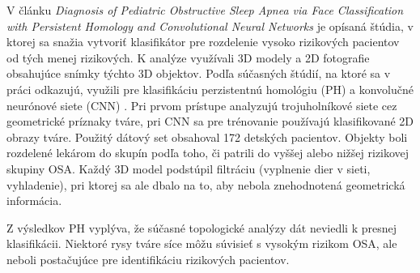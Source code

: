V článku \textit{Diagnosis of Pediatric Obstructive Sleep Apnea via Face Classification with Persistent Homology and Convolutional Neural Networks} \cite{Kiaee2019DiagnosisOP} je opísaná štúdia, v ktorej sa snažia vytvoriť klasifikátor pre rozdelenie vysoko rizikových pacientov od tých menej rizikových. K analýze využívali 3D modely a 2D fotografie obsahujúce snímky týchto 3D objektov. Podľa súčasných štúdií, na ktoré sa v práci odkazujú, využili pre klasifikáciu perzistentnú homológiu (PH) \cite{edelsbrunner2008persistent} a konvolučné neurónové siete (CNN) \cite{szegedy2017inception,szegedy2016rethinking}. Pri prvom prístupe analyzujú trojuholníkové siete cez geometrické príznaky tváre, pri CNN sa pre trénovanie používajú klasifikované 2D obrazy tváre. Použitý dátový set obsahoval 172 detských pacientov. Objekty boli rozdelené lekárom do skupín podľa toho, či patrili do vyššej alebo nižšej rizikovej skupiny OSA. Každý 3D model podstúpil filtráciu (vyplnenie dier v sieti, vyhladenie), pri ktorej sa ale dbalo na to, aby nebola znehodnotená geometrická informácia. 

Z výsledkov PH vyplýva, že súčasné topologické analýzy dát neviedli k presnej klasifikácii. Niektoré rysy tváre síce môžu súvisieť s vysokým rizikom OSA, ale neboli postačujúce pre identifikáciu rizikových pacientov. 


